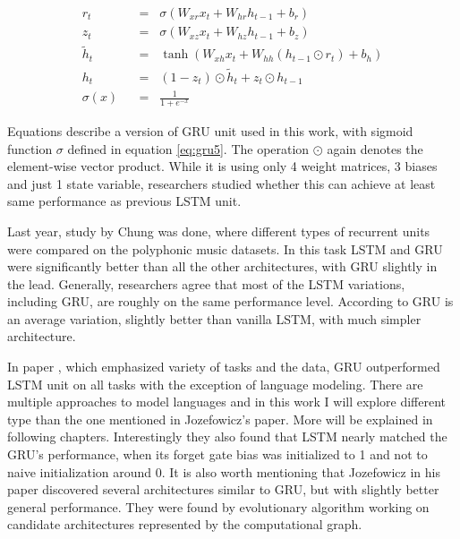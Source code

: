 \begin{align}
r_t \hspace{7pt}&=\hspace{7pt} \sigma(W_{xr}x_t + W_{hr}h_{t-1} + b_r) \label{eq:gru1}\\
z_t \hspace{7pt}&=\hspace{7pt} \sigma(W_{xz}x_t + W_{hz}h_{t-1} + b_z) \label{eq:gru2}\\
\widetilde{h}_t \hspace{7pt}&=\hspace{7pt} \tanh(W_{xh}x_t + W_{hh}(h_{t-1}\odot r_t) + b_h) \label{eq:gru3}\\
h_t \hspace{7pt}&=\hspace{7pt} (1-z_t)\odot \widetilde{h}_t + z_t\odot h_{t-1} \label{eq:gru4}\\[16pt]
\sigma(x) \hspace{7pt}&=\hspace{7pt} \frac{1}{1+e^{-x}} \label{eq:gru5}
\end{align}

Equations describe a version of GRU unit used in this work, with sigmoid function $ \sigma $ defined in equation \eqref{eq:gru5}. The operation $ \odot $ again denotes the element-wise vector product. While it is using only 4 weight matrices, 3 biases and just 1 state variable, researchers studied whether this can achieve at least same performance as previous LSTM unit.

Last year, study by Chung\cite{DBLP:journals/corr/ChungGCB14} was done, where different types of recurrent units were compared on the polyphonic music datasets. In this task LSTM and GRU were significantly better than all the other architectures, with GRU slightly in the lead. Generally, researchers agree that most of the LSTM variations, including GRU, are roughly on the same performance level. According to \cite{DBLP:journals/corr/GreffSKSS15} GRU is an average variation, slightly better than vanilla LSTM, with much simpler architecture.

In paper \cite{DBLP:conf/icml/JozefowiczZS15}, which emphasized variety of tasks and the data, GRU outperformed LSTM unit on all tasks with the exception of language modeling. There are multiple approaches to model languages and in this work I will explore different type than the one mentioned in Jozefowicz's paper\cite{DBLP:conf/icml/JozefowiczZS15}. More will be explained in following chapters. Interestingly they also found that LSTM nearly matched the GRU's performance, when its forget gate bias was initialized to 1 and not to naive initialization around 0.
It is also worth mentioning that Jozefowicz in his paper discovered several architectures similar to GRU, but with slightly better general performance. They were found by evolutionary algorithm working on candidate architectures  represented by the computational graph.



